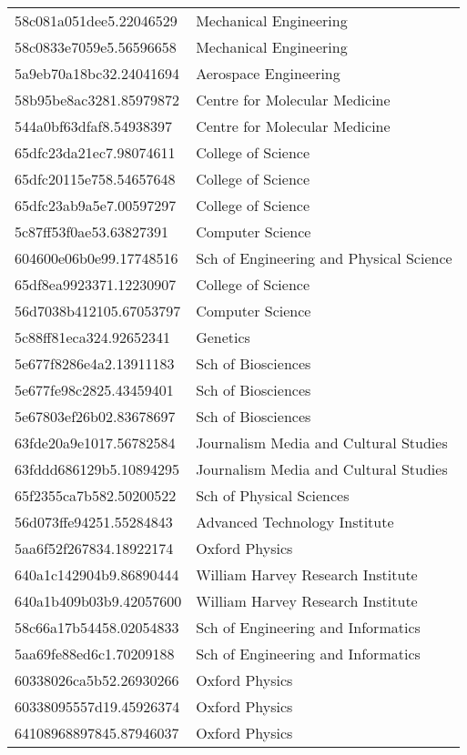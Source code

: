 \begin{tabular}{ll}
58c081a051dee5.22046529 & Mechanical Engineering \\
58c0833e7059e5.56596658 & Mechanical Engineering \\
5a9eb70a18bc32.24041694 & Aerospace Engineering \\
58b95be8ac3281.85979872 & Centre for Molecular Medicine \\
544a0bf63dfaf8.54938397 & Centre for Molecular Medicine \\
65dfc23da21ec7.98074611 & College of Science \\
65dfc20115e758.54657648 & College of Science \\
65dfc23ab9a5e7.00597297 & College of Science \\
5c87ff53f0ae53.63827391 & Computer Science \\
604600e06b0e99.17748516 & Sch of Engineering and Physical Science \\
65df8ea9923371.12230907 & College of Science \\
56d7038b412105.67053797 & Computer Science \\
5c88ff81eca324.92652341 & Genetics \\
5e677f8286e4a2.13911183 & Sch of Biosciences \\
5e677fe98c2825.43459401 & Sch of Biosciences \\
5e67803ef26b02.83678697 & Sch of Biosciences \\
63fde20a9e1017.56782584 & Journalism Media and Cultural Studies \\
63fddd686129b5.10894295 & Journalism Media and Cultural Studies \\
65f2355ca7b582.50200522 & Sch of Physical Sciences \\
56d073ffe94251.55284843 & Advanced Technology Institute \\
5aa6f52f267834.18922174 & Oxford Physics \\
640a1c142904b9.86890444 & William Harvey Research Institute \\
640a1b409b03b9.42057600 & William Harvey Research Institute \\
58c66a17b54458.02054833 & Sch of Engineering and Informatics \\
5aa69fe88ed6c1.70209188 & Sch of Engineering and Informatics \\
60338026ca5b52.26930266 & Oxford Physics \\
60338095557d19.45926374 & Oxford Physics \\
64108968897845.87946037 & Oxford Physics \\

\end{tabular}
